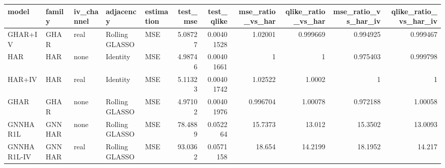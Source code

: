 \begin{tabular}{lllllrrrrrr}
\toprule
model & family & iv_channel & adjacency & estimation & test_mse & test_qlike & mse_ratio_vs_har & qlike_ratio_vs_har & mse_ratio_vs_har_iv & qlike_ratio_vs_har_iv \\
\midrule
GHAR+IV & GHAR & real & Rolling GLASSO & MSE & 5.08727 & 0.00401528 & 1.02001 & 0.999669 & 0.994925 & 0.999467 \\
HAR & HAR & none & Identity & MSE & 4.98746 & 0.00401661 & 1 & 1 & 0.975403 & 0.999798 \\
HAR+IV & HAR & real & Identity & MSE & 5.11323 & 0.00401742 & 1.02522 & 1.0002 & 1 & 1 \\
GHAR & GHAR & none & Rolling GLASSO & MSE & 4.97102 & 0.00401976 & 0.996704 & 1.00078 & 0.972188 & 1.00058 \\
GNNHAR1L & GNNHAR & none & Rolling GLASSO & MSE & 78.4889 & 0.052264 & 15.7373 & 13.012 & 15.3502 & 13.0093 \\
GNNHAR1L-IV & GNNHAR & real & Rolling GLASSO & MSE & 93.0362 & 0.0571158 & 18.654 & 14.2199 & 18.1952 & 14.217 \\
\bottomrule
\end{tabular}
